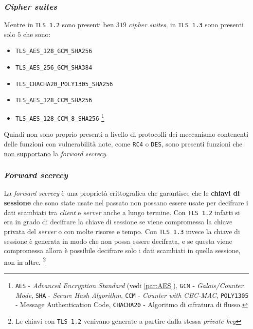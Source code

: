     \subsubsection{\textit{Cipher suites}}
    Mentre in \texttt{TLS 1.2} sono presenti ben $ 319 $ \textit{cipher suites}, in \texttt{TLS 1.3} sono presenti solo $ 5 $ che sono: \begin{itemize}
        \item \texttt{TLS\_AES\_128\_GCM\_SHA256} 
        \item \texttt{TLS\_AES\_256\_GCM\_SHA384} 
        \item \texttt{TLS\_CHACHA20\_POLY1305\_SHA256} 
        \item \texttt{TLS\_AES\_128\_CCM\_SHA256} 
        \item \texttt{TLS\_AES\_128\_CCM\_8\_SHA256}
        \footnote{
            \label{footnote:ciphersuites}
        \texttt{AES} - \textit{Advanced Encryption Standard} (vedi \ref{par:AES}), \texttt{GCM} - \textit{Galois/Counter Mode}, \texttt{SHA} - \textit{Secure Hash Algorithm}, \texttt{CCM} - \textit{Counter with CBC-MAC}, \texttt{POLY1305} - Message Authentication Code, \texttt{CHACHA20} - Algoritmo di cifratura di flusso.}
    \end{itemize}
    Quindi non sono proprio presenti a livello di protocolli dei meccanismo contenenti delle funzioni con vulnerabilità note, come \texttt{RC4} o \texttt{DES}, sono presenti funzioni che \underline{non supportano} la \textit{forward secrecy}.
    \subsubsection{\textit{Forward secrecy}}
    La \textit{forward secrecy} è una proprietà crittografica che garantisce che le \textbf{chiavi di sessione} che sono state usate nel passato non possano essere usate per decifrare i dati scambiati tra \textit{client} e \textit{server} anche a lungo termine. Con \texttt{TLS 1.2} infatti si era in grado di decifrare la chiave di sessione se viene compromessa la chiave privata del \textit{server} o con molte risorse e tempo. Con \texttt{TLS 1.3} invece la chiave di sessione è generata in modo che non possa essere decifrata, e se questa viene compromessa allora è possibile decifrare solo i dati scambiati in quella sessione, non in altre. \footnote{Le chiavi con \texttt{TLS 1.2} venivano generate a partire dalla stessa \textit{private key}}